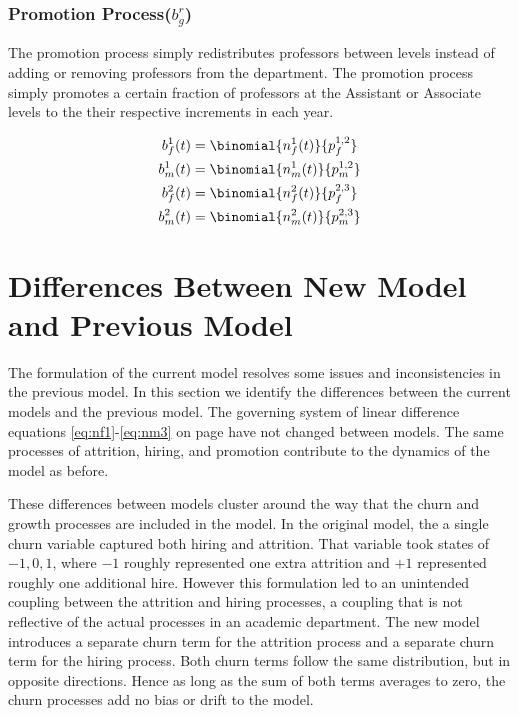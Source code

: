 \documentclass[12pt, a4paper, oneside, headinclude, footinclude,english]{article}
\begin{document}
\subsubsection{Promotion Process($b^r_g$)}
\label{sec:promotion}

The promotion process simply redistributes professors between levels instead of
adding or removing professors from the department. The promotion process simply
promotes a certain fraction of professors at the Assistant or Associate levels
to the their respective increments in each year.

\begin{align}
  b^1_f(t) &= \binomial{n^1_f(t)}{p^{1,2}_f}  \label{eq:attr_f1}\\
  b^1_m(t) &= \binomial{n^1_m(t)}{p^{1, 2}_m}  \label{eq:attr_m1} \\
  b^2_f(t) &= \binomial{n^2_f(t)}{p^{2, 3}_f}  \label{eq:attr_f2} \\
  b^2_m(t) &= \binomial{n^2_m(t)}{p^{2, 3}_m}  \label{eq:attr_m2}
\end{align}


\section{Differences Between New Model and Previous Model}
\label{sec:differences}

The formulation of the current model resolves some issues and inconsistencies in
the previous model. In this section we identify the differences between the
current models and the previous model. The governing system of linear difference
equations \ref{eq:nf1}-\ref{eq:nm3} on page \pageref{eq:nf1} have not changed
between models. The same processes of attrition, hiring, and promotion
contribute to the dynamics of the model as before.

These differences between models cluster around the way that the churn and
growth processes are included in the model. In the original model, the a single
churn variable captured both hiring and attrition. That variable took states of
$-1, 0, 1$, where $-1$ roughly represented one extra attrition and $+1$
represented roughly one additional hire. However this formulation led to an unintended
coupling between the attrition and hiring processes, a coupling that is not
reflective of the actual processes in an academic department. The new model
introduces a separate churn term for the attrition process and a separate churn
term for the hiring process. Both churn terms follow the same distribution, but
in opposite directions. Hence as long as the sum of both terms averages to zero,
the churn processes add no bias or drift to the model.
\end{document}
